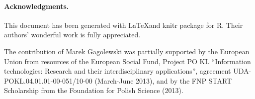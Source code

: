 \documentclass[11pt]{article}\usepackage[]{graphicx}\usepackage[]{color}
\newcommand{\package}[1]{\textsf{#1}\xspace}
\newcommand{\lang}[1]{\textsf{#1}\xspace}
\newcommand{\R}{\lang{R}}
\newcommand{\func}[1]{{\mathsf{#1}}}
\newtheorem{theorem}{Theorem}%
\theoremstyle{remark}
\theoremstyle{definition}
\begin{document}
%
%


%


\paragraph{Acknowledgments.}
This document has been generated with \LaTeX and \package{knitr}
package for \R. Their authors' wonderful work is fully appreciated.


The contribution of Marek Gagolewski was partially supported
by the European Union from resources of the European Social Fund, Project PO KL
``Information technologies: Research and their interdisciplinary
applications'', agreement UDA-POKL.04.01.01-00-051/10-00 (March-June 2013),
and by the FNP START Scholarship from the Foundation for Polish Science (2013).






\printindex
\end{document}
